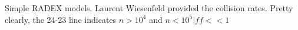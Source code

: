 Simple RADEX models.  Laurent Wiesenfeld provided the collision rates.  Pretty clearly, the 24-23 line indicates $n>10^4$ and $n<10^5 | ff << 1$